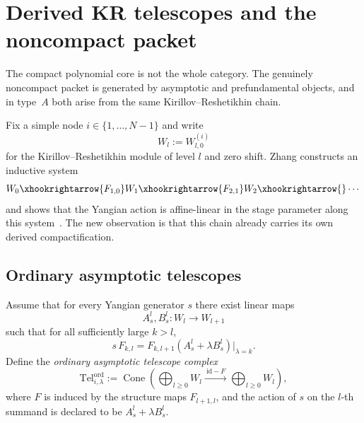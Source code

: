 \section{Derived KR telescopes and the noncompact packet}
\label{sec:typeA-derived-KR-telescopes}

The compact polynomial core is not the whole category. The genuinely
noncompact packet is generated by asymptotic and prefundamental objects,
and in type~$A$ both arise from the same Kirillov--Reshetikhin chain.

Fix a simple node $i\in\{1,\dots,N-1\}$ and write
\begin{equation}
W_l:=W^{(i)}_{l,0}
\end{equation}
for the Kirillov--Reshetikhin module of level $l$ and zero shift. Zhang
constructs an inductive system
\begin{equation}
W_0\xhookrightarrow{F_{1,0}}W_1\xhookrightarrow{F_{2,1}}W_2\xhookrightarrow{}\cdots
\end{equation}
and shows that the Yangian action is affine-linear in the stage parameter
along this system~\cite{Zhang24}. The new observation is that this chain
already carries its own derived compactification.

\subsection{Ordinary asymptotic telescopes}

\begin{definition}
\label{def:ordinary-asymptotic-telescope}
Assume that for every Yangian generator $s$ there exist linear maps
\begin{equation}
A_s^l,B_s^l:W_l\longrightarrow W_{l+1}
\end{equation}
such that for all sufficiently large $k>l$,
\begin{equation}
\label{eq:ordinary-asymptotic-stage-action}
s\,F_{k,l}=F_{k,l+1}(A_s^l+\lambda B_s^l)\big|_{\lambda=k}.
\end{equation}
Define the \emph{ordinary asymptotic telescope complex}
\begin{equation}
\label{eq:ordinary-telescope-definition}
\mathrm{Tel}^{\mathrm{ord}}_{i,\lambda}
:=
\operatorname{Cone}\!\left(
\bigoplus_{l\ge 0}W_l
\xrightarrow{\ \mathrm{id}-F\ }
\bigoplus_{l\ge 0}W_l
\right),
\end{equation}
where $F$ is induced by the structure maps $F_{l+1,l}$, and the action of
$s$ on the $l$-th summand is declared to be $A_s^l+\lambda B_s^l$.
\end{definition}

